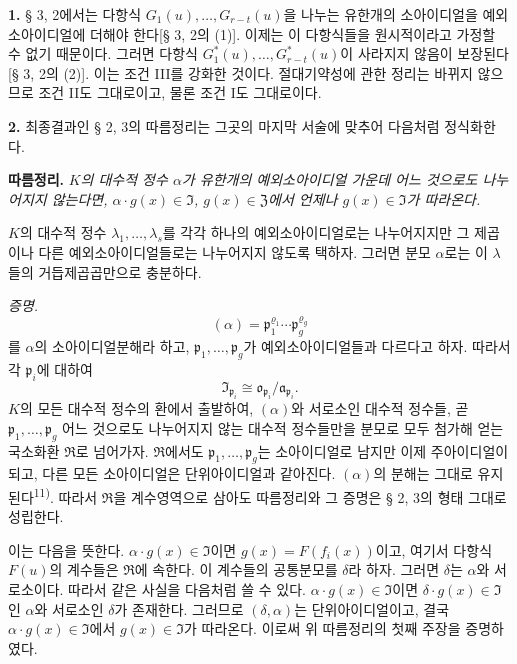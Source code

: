 \textbf{1.}
§ 3, 2에서는 다항식 \(G_1(u),\ldots,G_{r-t}(u)\)을 나누는 유한개의 소아이디얼을 예외소아이디얼에 더해야 한다[§ 3, 2의 (1)]. 이제는 이 다항식들을 원시적이라고 가정할 수 없기 때문이다. 그러면 다항식 \(G^*_1(u),\ldots,G^*_{r-t}(u)\)이 사라지지 않음이 보장된다[§ 3, 2의 (2)]. 이는 조건 III를 강화한 것이다. 절대기약성에 관한 정리는 바뀌지 않으므로 조건 II도 그대로이고, 물론 조건 I도 그대로이다.

\textbf{2.}
최종결과인 § 2, 3의 따름정리는 그곳의 마지막 서술에 맞추어 다음처럼 정식화한다.

\textbf{따름정리.}
\emph{\(K\)의 대수적 정수 \(\alpha\)가 유한개의 예외소아이디얼 가운데 어느 것으로도 나누어지지 않는다면, \(\alpha\cdot g(x)\in\mathfrak I\), \(g(x)\in\mathfrak Z\)에서 언제나 \(g(x)\in\mathfrak I\)가 따라온다.}

\(K\)의 대수적 정수 \(\lambda_1,\ldots,\lambda_s\)를 각각 하나의 예외소아이디얼로는 나누어지지만 그 제곱이나 다른 예외소아이디얼들로는 나누어지지 않도록 택하자. 그러면 분모 \(\alpha\)로는 이 \(\lambda\)들의 거듭제곱곱만으로 충분하다.

\emph{증명.}
\[
(\alpha)=\mathfrak p_1^{\varrho_1}\cdots\mathfrak p_g^{\varrho_g}
\]
를 \(\alpha\)의 소아이디얼분해라 하고, \(\mathfrak p_1,\ldots,\mathfrak p_g\)가 예외소아이디얼들과 다르다고 하자. 따라서 각 \(\mathfrak p_i\)에 대하여
\[
\mathfrak I_{\mathfrak p_i}\cong
\mathfrak o_{\mathfrak p_i}/\mathfrak a_{\mathfrak p_i}.
\]
\(K\)의 모든 대수적 정수의 환에서 출발하여, \((\alpha)\)와 서로소인 대수적 정수들, 곧 \(\mathfrak p_1,\ldots,\mathfrak p_g\) 어느 것으로도 나누어지지 않는 대수적 정수들만을 분모로 모두 첨가해 얻는 국소화환 \(\mathfrak R\)로 넘어가자. \(\mathfrak R\)에서도 \(\mathfrak p_1,\ldots,\mathfrak p_g\)는 소아이디얼로 남지만 이제 주아이디얼이 되고, 다른 모든 소아이디얼은 단위아이디얼과 같아진다. \((\alpha)\)의 분해는 그대로 유지된다\textsuperscript{11)}. 따라서 \(\mathfrak R\)을 계수영역으로 삼아도 따름정리와 그 증명은 § 2, 3의 형태 그대로 성립한다.

이는 다음을 뜻한다. \(\alpha\cdot g(x)\in\mathfrak I\)이면 \(g(x)=F(f_i(x))\)이고, 여기서 다항식 \(F(u)\)의 계수들은 \(\mathfrak R\)에 속한다. 이 계수들의 공통분모를 \(\delta\)라 하자. 그러면 \(\delta\)는 \(\alpha\)와 서로소이다. 따라서 같은 사실을 다음처럼 쓸 수 있다. \(\alpha\cdot g(x)\in\mathfrak I\)이면 \(\delta\cdot g(x)\in\mathfrak I\)인 \(\alpha\)와 서로소인 \(\delta\)가 존재한다. 그러므로 \((\delta,\alpha)\)는 단위아이디얼이고, 결국 \(\alpha\cdot g(x)\in\mathfrak I\)에서 \(g(x)\in\mathfrak I\)가 따라온다. 이로써 위 따름정리의 첫째 주장을 증명하였다.

